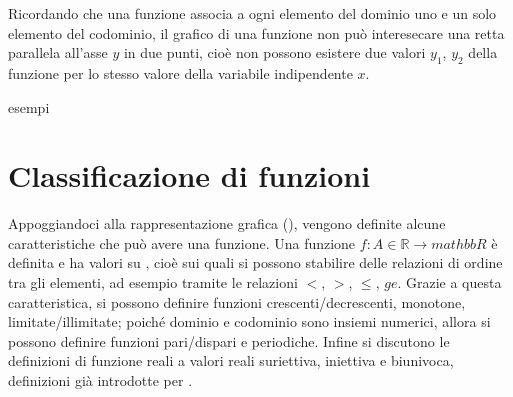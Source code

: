 \documentclass[letterpaper,10pt,italian]{jupyterBook}
\begin{document}
\sphinxAtStartPar
Ricordando che una funzione associa a ogni elemento del dominio uno e un solo elemento del codominio, il grafico di una funzione non può interesecare una retta parallela all’asse \(y\) in due punti, cioè non possono esistere due valori \(y_1\), \(y_2\) della funzione per lo stesso valore della variabile indipendente \(x\).

\sphinxAtStartPar
{} esempi


\section{Classificazione di funzioni}
\label{\detokenize{ch/precalculus/real-functions:classificazione-di-funzioni}}\label{\detokenize{ch/precalculus/real-functions:math-hs-precalculus-real-functions-types}}
\sphinxAtStartPar
Appoggiandoci alla rappresentazione grafica (), vengono definite alcune caratteristiche che può avere una funzione. Una funzione \(f: A \in  \mathbb{R} \rightarrow mathbb{R}\) è definita e ha valori su , cioè sui quali si possono stabilire delle relazioni di ordine tra gli elementi, ad esempio tramite le relazioni \(<\), \(>\), \(\le\), \(ge\). Grazie a questa caratteristica, si possono definire funzioni crescenti/decrescenti, monotone, limitate/illimitate; poiché dominio e codominio sono insiemi numerici, allora si possono definire funzioni pari/dispari e periodiche. Infine si discutono le definizioni di funzione reali a valori reali suriettiva, iniettiva e biunivoca, definizioni già introdotte per {\hyperref[\detokenize{ch/set:math-hs-fun}]{}}.
\end{document}
